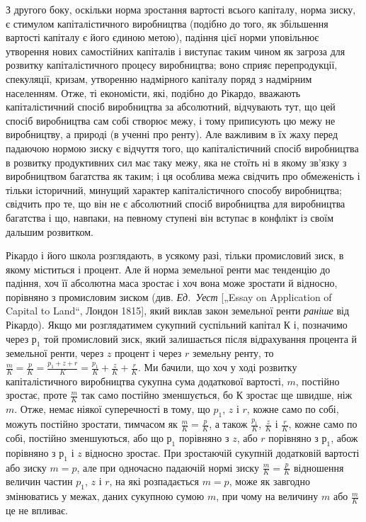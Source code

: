 З другого боку, оскільки норма зростання вартості всього капіталу, норма зиску, є стимулом
капіталістичного виробництва (подібно до того, як збільшення вартості капіталу є його єдиною метою),
падіння цієї норми уповільнює утворення нових самостійних капіталів і виступає таким чином як
загроза для розвитку капіталістичного процесу виробництва; воно сприяє перепродукції, спекуляції,
кризам, утворенню надмірного капіталу поряд з надмірним населенням. Отже, ті економісти, які,
подібно до Рікардо, вважають капіталістичний спосіб виробництва за абсолютний, відчувають тут, що
цей спосіб виробництва сам собі створює межу, і тому приписують цю межу не виробництву, а природі (в
ученні про ренту). Але важливим в їх жаху перед падаючою нормою зиску є відчуття того, що
капіталістичний спосіб виробництва в розвитку продуктивних сил має таку межу, яка не стоїть ні в
якому зв’язку з виробництвом багатства як таким;
і ця особлива межа свідчить про обмеженість і тільки
історичний, минущий характер капіталістичного способу виробництва;
свідчить про те, що він не є абсолютний спосіб виробництва
для виробництва багатства і що, навпаки, на певному
ступені він вступає в конфлікт із своїм дальшим розвитком.

Рікардо і його школа розглядають, в усякому разі, тільки промисловий
зиск, в якому міститься і процент. Але й норма земельної
ренти має тенденцію до падіння, хоч її абсолютна маса зростає
і хоч вона може зростати й відносно, порівняно з промисловим
зиском (див. \emph{Ед.~Уест} [„Essay on Application of Capital to Land“,
Лондон 1815], який виклав закон земельної ренти \emph{раніше} від
Рікардо). Якщо ми розглядатимем сукупний суспільний капітал
$К$ і, позначимо через $р_1$ той промисловий зиск, який залишається
після відрахування процента й земельної ренти, через $z$
процент і через $r$ земельну ренту, то
$\frac{m}{K} = \frac{p}{K} = \frac{p_1 + z + r}{K} = \frac{p_1}{K} + \frac{z}{K} + \frac{r}{K}$.
Ми бачили, що хоч у ході розвитку капіталістичного
виробництва сукупна сума додаткової вартості, $m$, постійно
зростає, проте $\frac{m}{K}$ так само постійно зменшується, бо $К$
зростає ще швидше, ніж $m$. Отже, немає ніякої суперечності
в тому, що $p_1$, $z$ і $r$, кожне само по собі, можуть постійно зростати,
тимчасом як $\frac{m}{K} = \frac{p}{K}$, а також $\frac{p_1}{K}$, $\frac{z}{K}$ і $\frac{r}{K}$, кожне само
по собі, постійно зменшуються, або що $р_1$ порівняно з $z$, або
$r$ порівняно з $р_1$, абож порівняно з $р_1$ і $z$ відносно зростає.
При зростаючій сукупній додатковій вартості або зиску $m = p$, але
при одночасно падаючій нормі зиску $\frac{m}{K} = \frac{p}{K}$ відношення величин
частин $p_1$, $z$ і $r$, на які розпадається $m = p$, може як завгодно
змінюватись у межах, даних сукупною сумою $m$, при чому
на величину $m$ або $\frac{m}{K}$ це не впливає.

